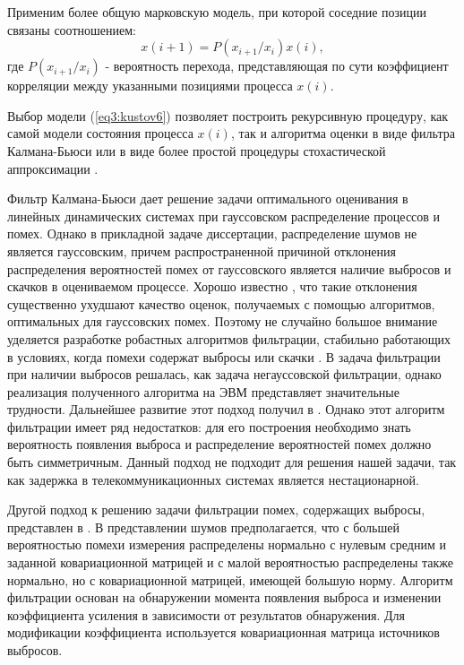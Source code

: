 Применим более общую марковскую модель, при которой соседние позиции связаны соотношением:
\begin{equation}\label{eq3:kustov6}
x(i+1)=P(x_{i+1}/x_i)x(i),
\end{equation}
\noindent где $P(x_{i+1}/x_i)$ - вероятность перехода, представляющая по сути коэффициент корреляции между указанными позициями процесса $x(i)$.

Выбор модели (\ref{eq3:kustov6}) позволяет построить рекурсивную процедуру, как самой модели состояния процесса $x(i)$, 
так и алгоритма оценки в виде фильтра Калмана-Бьюси или в виде более простой процедуры стохастической аппроксимации \cite{tihonov}.










Фильтр Калмана-Бьюси дает решение задачи оптимального оценивания в линейных динамических системах при гауссовском распределение процессов и помех.
Однако в прикладной задаче диссертации, распределение шумов не является гауссовским, причем распространенной причиной отклонения распределения вероятностей помех от гауссовского является наличие выбросов и скачков в оцениваемом процессе.
Хорошо известно \cite{cipkin}, что такие отклонения существенно ухудшают качество оценок, получаемых с помощью алгоритмов, оптимальных для гауссовских помех.
Поэтому не случайно большое внимание уделяется разработке робастных алгоритмов фильтрации, стабильно работающих в условиях, когда помехи содержат выбросы или скачки \cite{Klekis, masreliez_ieee, masreliez_martin, ershov_lipcer, ershov, RobustFilter}.
В \cite{masreliez_ieee} задача фильтрации при наличии выбросов решалась, как задача   негауссовской фильтрации, однако реализация полученного алгоритма на ЭВМ представляет значительные трудности. 
Дальнейшее развитие этот подход получил в \cite{masreliez_martin}. Однако этот алгоритм фильтрации имеет ряд недостатков: для его построения необходимо знать вероятность появления выброса и распределение вероятностей помех должно быть симметричным. Данный подход не подходит для решения нашей задачи, так как задержка в телекоммуникационных системах является нестационарной.

Другой подход к решению задачи фильтрации помех, содержащих выбросы, представлен в \cite{ershov_lipcer, ershov}. В представлении шумов предполагается, что с большей вероятностью помехи измерения распределены нормально с нулевым средним и заданной ковариационной матрицей и с малой вероятностью распределены также нормально,  но с ковариационной матрицей, имеющей большую норму. Алгоритм фильтрации основан на обнаружении момента появления выброса и изменении коэффициента усиления в зависимости от результатов обнаружения. Для модификации коэффициента используется ковариационная матрица источников выбросов.

